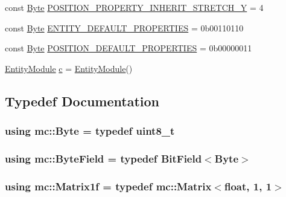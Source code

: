 \begin{DoxyCompactItemize}
\item 
const \hyperlink{namespacemc_a64bc4fa1f43bc4da5c7ac98c04c863e8}{Byte} \hyperlink{namespacemc_a29d2f6b06f29e315be17e977d9a7eabb}{P\+O\+S\+I\+T\+I\+O\+N\+\_\+\+P\+R\+O\+P\+E\+R\+T\+Y\+\_\+\+I\+N\+H\+E\+R\+I\+T\+\_\+\+S\+T\+R\+E\+T\+C\+H\+\_\+Y} = 4
\item 
const \hyperlink{namespacemc_a64bc4fa1f43bc4da5c7ac98c04c863e8}{Byte} \hyperlink{namespacemc_aad93bda8c11c45721d4d2feb348f9d5f}{E\+N\+T\+I\+T\+Y\+\_\+\+D\+E\+F\+A\+U\+L\+T\+\_\+\+P\+R\+O\+P\+E\+R\+T\+I\+ES} = 0b00110110
\item 
const \hyperlink{namespacemc_a64bc4fa1f43bc4da5c7ac98c04c863e8}{Byte} \hyperlink{namespacemc_a47f82d173aac0c2dab851dfd482fb9d7}{P\+O\+S\+I\+T\+I\+O\+N\+\_\+\+D\+E\+F\+A\+U\+L\+T\+\_\+\+P\+R\+O\+P\+E\+R\+T\+I\+ES} = 0b00000011
\item 
\hyperlink{classmc_1_1_entity_module}{Entity\+Module} \hyperlink{namespacemc_aa5eba7e44cd2db9ee9888a800c161b29}{c} = \hyperlink{classmc_1_1_entity_module}{Entity\+Module}()
\end{DoxyCompactItemize}


\subsection{Typedef Documentation}
\subsubsection[{\texorpdfstring{Byte}{Byte}}]{\setlength{\rightskip}{0pt plus 5cm}using {\bf mc\+::\+Byte} = typedef {\bf uint8\+\_\+t}}\hypertarget{namespacemc_a64bc4fa1f43bc4da5c7ac98c04c863e8}{}\label{namespacemc_a64bc4fa1f43bc4da5c7ac98c04c863e8}
\subsubsection[{\texorpdfstring{Byte\+Field}{ByteField}}]{\setlength{\rightskip}{0pt plus 5cm}using {\bf mc\+::\+Byte\+Field} = typedef {\bf Bit\+Field}$<${\bf Byte}$>$}\hypertarget{namespacemc_a4ed352b00f84d2c3e9843cf5ea375ca0}{}\label{namespacemc_a4ed352b00f84d2c3e9843cf5ea375ca0}
\subsubsection[{\texorpdfstring{Matrix1f}{Matrix1f}}]{\setlength{\rightskip}{0pt plus 5cm}using {\bf mc\+::\+Matrix1f} = typedef {\bf mc\+::\+Matrix}$<$float, 1, 1$>$}\hypertarget{namespacemc_a6b3e43f58be598160b2a72a45f8da74a}{}\label{namespacemc_a6b3e43f58be598160b2a72a45f8da74a}

